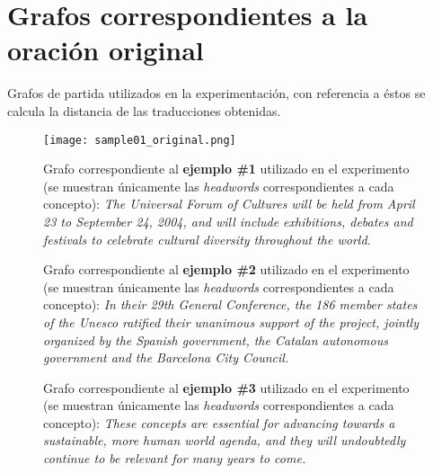 \documentclass[a4paper,12pt,spanish]{book}
\begin{document}
\section{Grafos correspondientes a la oración original}
\label{appendix-data:grafos-correspondientes-a-la-oracion-original}
Grafos de partida utilizados en la experimentación, con referencia a éstos se
calcula la distancia de las traducciones obtenidas.
\begin{figure}[htbp]
\centering
\capstart

\texttt{[image: sample01\_original.png]}
\caption[Grafo correspondiente a la oración original del ejemplo \#1 utilizado en el experimento.]{Grafo correspondiente al \textbf{ejemplo \#1} utilizado en el experimento (se muestran
únicamente las \emph{headwords} correspondientes a cada concepto): \emph{The Universal
Forum of Cultures will be held from April 23 to September 24, 2004, and will
include exhibitions, debates and festivals to celebrate cultural diversity
throughout the world.}}\label{appendix-data:sample01-original}\end{figure}
\begin{figure}[htbp]
\centering
\capstart

\caption[Grafo correspondiente a la oración original del ejemplo \#2 utilizado en el experimento.]{Grafo correspondiente al \textbf{ejemplo \#2} utilizado en el experimento (se muestran
únicamente las \emph{headwords} correspondientes a cada concepto): \emph{In their 29th
General Conference, the 186 member states of the Unesco ratified their unanimous
support of the project, jointly organized by the Spanish government, the Catalan
autonomous government and the Barcelona City Council.}}\label{appendix-data:sample02-original}\end{figure}
\begin{figure}[htbp]
\centering
\capstart

\caption[Grafo correspondiente a la oración original del ejemplo \#3 utilizado en el experimento.]{Grafo correspondiente al \textbf{ejemplo \#3} utilizado en el experimento (se muestran
únicamente las \emph{headwords} correspondientes a cada concepto): \emph{These concepts
are essential for advancing towards a sustainable, more human world agenda,
and they will undoubtedly continue to be relevant for many years to come.}}\label{appendix-data:sample03-original}\end{figure}
\end{document}
